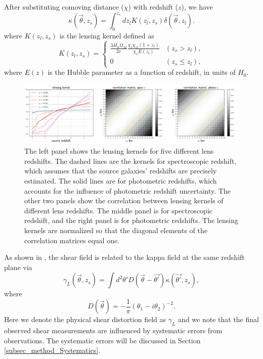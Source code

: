 \documentclass[twocolumn]{aastex62}
\begin{document}
After substituting comoving distance ($\chi$) with redshift ($z$), we have
\begin{equation}\label{eq-delta2kappa}
\kappa(\vec{\theta},z_s)=\int_0^{z_s} dz_l K(z_l,z_s)\delta(\vec{\theta},z_l).
\end{equation}
where $K(z_l,z_s)$ is the lensing kernel defined as
\begin{equation}
K(z_l,z_s) =
\begin{cases}
\frac{3H_0\Omega_M}{2 c} \frac{\chi_l \chi_{sl} (1+z_l)}{\chi_{s} E\left(z_l\right)} & (z_s>z_l),\\
0&(z_s \leq z_l),
\end{cases}
\end{equation}
where $E(z)$ is the Hubble parameter as a function of redshift, in units of $H_0$.

\begin{figure}[!t]
 \centering
 \includegraphics[width=1.\textwidth]{lensing_kernel.pdf}
 \caption{The left panel shows the lensing kernels for five different lens
         redshifts. The dashed lines are the kernels for spectroscopic redshift,
         which assumes that the source galaxies' redshifts are precisely
         estimated. The solid lines are for photometric redshifts, which
         accounts for the influence of photometric redshift uncertainty. The
         other two panels show the correlation between lensing kernels of
         different lens redshifts. The middle panel is for spectroscopic
         redshift, and the right panel is for photometric redshifts. The
         lensing kernels are normalized so that the diagonal elements of the
         correlation matrices equal one.
        }\label{fig_corlensKer}
\end{figure}

As shown in \citet{massMap-KS1993}, the shear field is related to the kappa
field at the same redshift plane via
\begin{equation}\label{eq-kappa2gamma}
\gamma_L(\vec{\theta},z_s) = \int  d^2 \theta' D(\vec{\theta}-\vec{\theta'}) \kappa(\vec{\theta'},z_s),
\end{equation}
where
\begin{equation}
D(\vec{\theta})=-\frac{1}{\pi}(\theta_1-i\theta_2)^{-2}.
\end{equation}
Here we denote the physical shear distortion field as $\gamma_L$ and we note
that the final observed shear measurements are influenced by systematic errors
from observations. The systematic errors will be discussed in Section
\ref{subsec_method_Systematics}.
\end{document}
